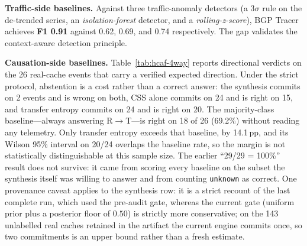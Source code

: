 \textbf{Traffic-side baselines.} Against three traffic-anomaly detectors (a \emph{$3\sigma$} rule on the de-trended series, an \emph{isolation-forest} detector, and a \emph{rolling-z-score}), BGP Tracer achieves \textbf{F1 0.91} against 0.62, 0.69, and 0.74 respectively. The gap validates the context-aware detection principle.

\textbf{Causation-side baselines.} Table~\ref{tab:hcaf-4way} reports directional verdicts on the 26 real-cache events that carry a verified expected direction. Under the strict protocol, abstention is a cost rather than a correct answer: the synthesis commits on 2 events and is wrong on both, CSS alone commits on 24 and is right on 15, and transfer entropy commits on 24 and is right on 20. The majority-class baseline---always answering R$\to$T---is right on 18 of 26 (69.2\%) without reading any telemetry. Only transfer entropy exceeds that baseline, by 14.1\,pp, and its Wilson 95\% interval on 20/24 overlaps the baseline rate, so the margin is not statistically distinguishable at this sample size. The earlier ``29/29 = 100\%'' result does not survive: it came from scoring every baseline on the subset the synthesis itself was willing to answer and from counting \texttt{unknown} as correct. One provenance caveat applies to the synthesis row: it is a strict recount of the last complete run, which used the pre-audit gate, whereas the current gate (uniform prior plus a posterior floor of $0.50$) is strictly more conservative; on the 143 unlabelled real caches retained in the artifact the current engine commits once, so two commitments is an upper bound rather than a fresh estimate.

